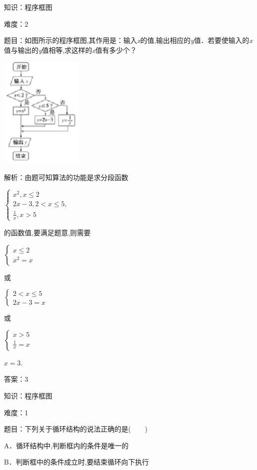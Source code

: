 \documentclass{article} %
\begin{document}
知识：程序框图

难度：2

题目：如图所示的程序框图,其作用是：输入\textit{x}的值,输出相应的\textit{y}值．若要使输入的\textit{x}值与输出的\textit{y}值相等,求这样的\textit{x}值有多少个？

\includegraphics*[width=1.59in, height=2.15in, keepaspectratio=false]{image14}

解析：由题可知算法的功能是求分段函数

$\left\{\begin{array}{l}
x^2,x\le2\\
2x-3,2<x \le 5,\\
\frac{1}{x},x>5
\end{array}\right.$

的函数值,要满足题意,则需要

$\left\{\begin{array}{l}
x\le2\\
x^2=x
\end{array}\right.$

或

$\left\{\begin{array}{l}
2<x\le5\\
2x-3=x
\end{array}\right.$

或

$\left\{\begin{array}{l}
x>5\\
\frac{1}{x}=x
\end{array}\right.$

$x=3$.

答案：3




知识：程序框图

难度：1

题目：下列关于循环结构的说法正确的是(　　)

A．循环结构中,判断框内的条件是唯一的

B．判断框中的条件成立时,要结束循环向下执行
\end{document}
